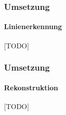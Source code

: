 \documentclass[xcolor=dvipsnames]{beamer}
\begin{document}
\begin{frame}
	\frametitle{Umsetzung}
	\framesubtitle{Linienerkennung}

	[TODO]

\end{frame}


\begin{frame}
	\frametitle{Umsetzung}
	\framesubtitle{Rekonstruktion}

	[TODO]

\end{frame}
\end{document}
